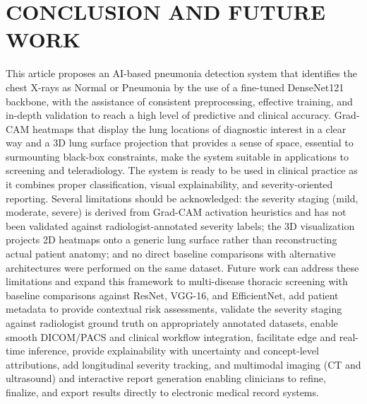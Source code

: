 \documentclass[conference]{IEEEtran}
\begin{document}
\section{\textbf{CONCLUSION AND FUTURE WORK}}
This article proposes an AI-based pneumonia detection system that identifies the chest X-rays as Normal or Pneumonia by the use of a fine-tuned DenseNet121 backbone, with the assistance of consistent preprocessing, effective training, and in-depth validation to reach a high level of predictive and clinical accuracy. Grad-CAM heatmaps that display the lung locations of diagnostic interest in a clear way and a 3D lung surface projection that provides a sense of space, essential to surmounting black-box constraints, make the system suitable in applications to screening and teleradiology. The system is ready to be used in clinical practice as it combines proper classification, visual explainability, and severity-oriented reporting. Several limitations should be acknowledged: the severity staging (mild, moderate, severe) is derived from Grad-CAM activation heuristics and has not been validated against radiologist-annotated severity labels; the 3D visualization projects 2D heatmaps onto a generic lung surface rather than reconstructing actual patient anatomy; and no direct baseline comparisons with alternative architectures were performed on the same dataset. Future work can address these limitations and expand this framework to multi-disease thoracic screening with baseline comparisons against ResNet, VGG-16, and EfficientNet, add patient metadata to provide contextual risk assessments, validate the severity staging against radiologist ground truth on appropriately annotated datasets, enable smooth DICOM/PACS and clinical workflow integration, facilitate edge and real-time inference, provide explainability with uncertainty and concept-level attributions, add longitudinal severity tracking, and multimodal imaging (CT and ultrasound) and interactive report generation enabling clinicians to refine, finalize, and export results directly to electronic medical record systems.
\end{document}
